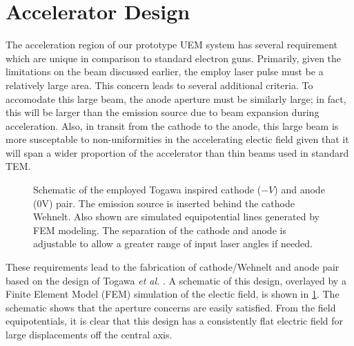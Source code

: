 \section{Accelerator Design} \label{sec:gun_design}

The acceleration region of our prototype UEM system has several requirement which are unique in comparison to standard electron guns.
Primarily, given the limitations on the beam discussed earlier, %
the employ laser pulse must be a relatively large area.
This concern leads to several additional criteria.
To accomodate this large beam, the anode aperture must be similarly large; in fact, this will be larger than the emission source due to beam expansion during acceleration.
Also, in transit from the cathode to the anode, this large beam is more susceptable to non-uniformities in the accelerating electic field given that it will span a wider proportion of the accelerator than thin beams used in standard TEM.

\begin{figure}
  \centering
  
  \caption{
    Schematic of the employed Togawa inspired cathode ($-V$) and anode (0V) pair.
    The emission source is inserted behind the cathode Wehnelt.
    Also shown are simulated equipotential lines generated by FEM modeling.
    The separation of the cathode and anode is adjustable to allow a greater range of input laser angles if needed. 
  }
  \label{fig:gun-field}
\end{figure}

These requirements lead to the fabrication of cathode/Wehnelt and anode pair based on the design of Togawa \textit{et al.} \cite{togawa_ceb6_2007}.
A schematic of this design, overlayed by a Finite Element Model (FEM) simulation of the electic field, is shown in \ref{fig:gun-field}.
The schematic shows that the aperture concerns are easily satisfied.
From the field equipotentials, it is clear that this design has a consistently flat electric field for large displacements off the central axis.

